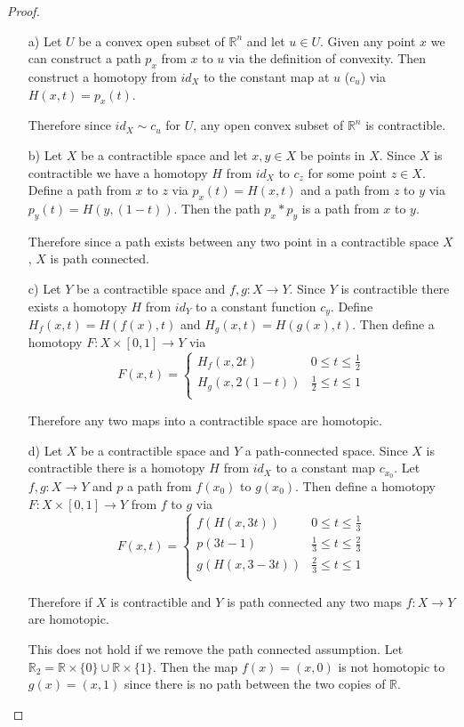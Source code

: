 \documentclass[10pt]{article}
\newcommand{\bb}[1]{\mathbb{#1}}
\theoremstyle{plain}
\theoremstyle{remark}
\begin{document}
\begin{proof}
  \begin{itemize}
  \item[a)] Let $U$ be a convex open subset of $\bb{R}^n$ and let $u\in U$. 
    Given any point $x$ we can construct a path $p_x$ from $x$ to $u$ via the definition
    of convexity. Then construct a homotopy from $id_X$  to the constant map at $u$
    ($c_u$) via $H(x,t)=p_x(t)$.

    Therefore since $id_X\sim c_u$ for $U$, any open convex subset of $\bb{R}^n$ is
    contractible.
  \item[b)] Let $X$ be a contractible space and let $x,y\in X$ be points in $X$.
    Since $X$ is contractible we have a homotopy $H$ from $id_X$ to $c_z$ for some
    point $z\in X$. Define a path from $x$ to $z$ via $p_x(t)=H(x,t)$ and a path
    from $z$ to $y$ via $p_y(t)=H(y,(1-t))$. Then the path $p_x*p_y$ is a path
    from $x$ to $y$.

    Therefore since a path exists between any two point in a contractible space $X$,
    $X$ is path connected.
  \item[c)] Let $Y$ be a contractible space and $f,g:X\rightarrow Y$. Since $Y$ is
    contractible there exists a homotopy $H$ from $id_Y$ to a constant function
    $c_y$. Define $H_f(x,t)=H(f(x),t)$ and $H_g(x,t)=H(g(x),t)$. Then define
    a homotopy $F:X\times[0,1]\rightarrow Y$ via
    \[
      F(x,t) = \left\{
        \begin{array}{cc}
          H_f(x,2t) & 0\leq t \leq \frac{1}{2}\\
          H_g(x,2(1-t)) & \frac{1}{2}\leq  t\leq 1\\
        \end{array}
        \right.
      \]

      Therefore any two maps into a contractible space are homotopic.
    \item[d)] Let $X$ be a contractible space and $Y$ a path-connected space. Since
      $X$ is contractible there is a homotopy $H$ from $id_X$ to a constant map $c_{x_0}$.
      Let $f,g:X\rightarrow Y$ and $p$ a path from $f(x_0)$ to $g(x_0)$. Then define
      a homotopy $F:X\times[0,1]\rightarrow Y$ from $f$ to $g$ via
      \[
        F(x,t) = \left\{
          \begin{array}{cc}
            f(H(x,3t)) & 0\leq t\leq \frac{1}{3}\\
            p(3t-1) & \frac{1}{3}\leq t\leq\frac{2}{3}\\
            g(H(x,3-3t)) & \frac{2}{3}\leq t \leq 1\\
          \end{array}
        \right.
      \]

      Therefore if $X$ is contractible and $Y$ is path connected any two maps
      $f:X\rightarrow Y$ are homotopic.

      This does not hold if we remove the path connected assumption. Let
      $\bb{R}_2=\bb{R}\times\{0\}\cup \bb{R}\times\{1\}$. Then
      the map $f(x)=(x,0)$ is not homotopic to $g(x)=(x,1)$ since there is no path
      between the two copies of $\bb{R}$.
  \end{itemize}
\end{proof}
\end{document}
